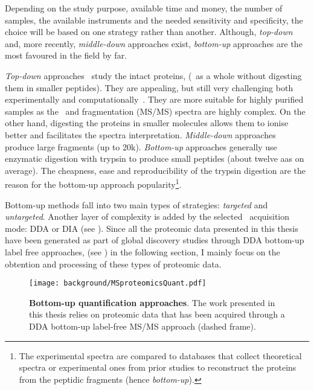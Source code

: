 Depending on the study purpose,
available time and money,
the number of samples,
the available instruments
and the needed sensitivity and specificity,
the choice will be based on one strategy rather than another.
Although, \emph{top-down} and, more recently, \emph{middle-down} approaches exist,
\emph{bottom-up} approaches are the most favoured in the field by far.\mybr\

\emph{Top-down} approaches~ study the intact proteins,
(\ie\ as a whole without digesting them in smaller peptides).
They are appealing, but still very challenging both
experimentally and computationally~.
They are more suitable for highly purified samples
as the \ms\ and fragmentation (\gls{MS/MS}) spectra are highly complex.
On the other hand,
digesting the proteins in smaller molecules allows them
to ionise better and facilitates the spectra interpretation.
\emph{Middle-down} approaches~ produce
large fragments (up to 20k).
\emph{Bottom-up} approaches generally use enzymatic digestion with trypsin
to produce small peptides (about twelve \glspl{aa} on average).
The cheapness, ease and reproducibility of the trypsin digestion
are the reason for the bottom-up approach popularity\footnote{%
The experimental spectra are compared to databases
that collect theoretical spectra or experimental ones from prior studies
to reconstruct the proteins from the peptidic fragments (hence \emph{bottom-up}).%
}.\mybr\

Bottom-up methods fall into two main types of strategies:
\emph{targeted} and \emph{untargeted}.
Another layer of complexity is added by the selected \ms\ acquisition mode:
\gls{DDA} or \gls{DIA} (see ).
Since all the proteomic data presented in this thesis
have been generated as part of global discovery studies
through \gls{DDA} bottom-up label free approaches,
(see )
in the following section,
I mainly focus on the obtention and processing of these types of proteomic data.\mybr\

\begin{figure}[!htbp]
    \texttt{[image: background/MSproteomicsQuant.pdf]}\centering
    \caption[Bottom-up quantification approaches]{\label{fig:msbottomupQuant}%
    \textbf{Bottom-up quantification approaches}.
    The work presented in this thesis relies on proteomic data
    that has been acquired through a \gls{DDA} bottom-up label-free
    \gls{MS/MS} approach (dashed frame).
    }
\end{figure}

